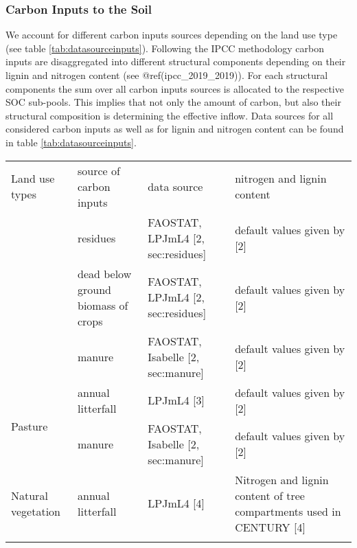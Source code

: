 \documentclass[gc, manuscript]{copernicus}
\begin{document}
\hypertarget{sec:carboninputs}{%
\subsubsection{Carbon Inputs to the Soil}\label{sec:carboninputs}}

We account for different carbon inputs sources depending on the land use type (see table \ref{tab:datasourceinputs}). Following the IPCC methodology carbon inputs are disaggregated into different structural components depending on their lignin and nitrogen content (see @ref(ipcc\_2019\_2019)). For each structural components the sum over all carbon inputs sources is allocated to the respective SOC sub-pools. This implies that not only the amount of carbon, but also their structural composition is determining the effective inflow. Data sources for all considered carbon inputs as well as for lignin and nitrogen content can be found in table \ref{tab:datasourceinputs}.

 \begin{table*}[h]
 \caption{Type and data sources for carbon inputs to different land use types}
 \begin{tabular}{l l l l}
 \tophline
  Land use types   & source of carbon inputs & data source & nitrogen and lignin content \\
 \middlehline
 \multirow{3}{*}{Cropland} & residues & FAOSTAT, LPJmL4 [2, sec:residues] & default values given by [2]  \\
                            & dead below ground biomass of crops & FAOSTAT, LPJmL4 [2, sec:residues] & default values given by [2] \\
                            & manure & FAOSTAT, Isabelle [2, sec:manure] & default values given by [2] \\
                            \hline
 \multirow{2}{*}{Pasture}  & annual litterfall & LPJmL4 [3] & default values given by [2] \\ 
                            & manure  & FAOSTAT, Isabelle [2, sec:manure] & default values given by [2] \\
                            \hline
  Natural vegetation        & annual litterfall & LPJmL4 [4]& \begin{minipage}[t]{0.28\columnwidth}\raggedright\strut Nitrogen and lignin content of tree compartments used in CENTURY [4] \strut \end{minipage}\tabularnewline
 \bottomhline
 \end{tabular}
 \label{tab:datasourceinputs}
 \belowtable{}
 \end{table*}
\end{document}
